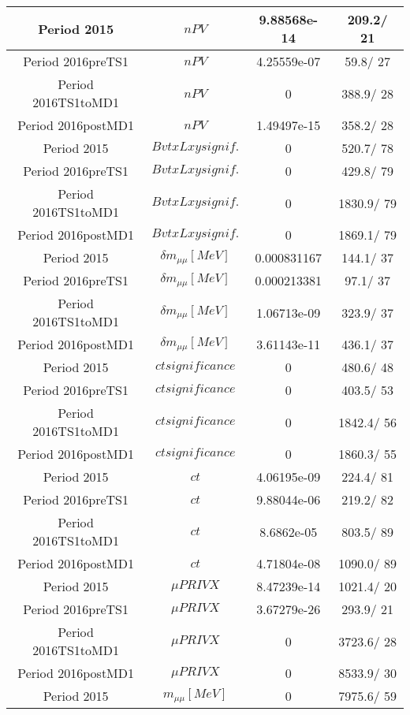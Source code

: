 \documentclass{article}
\begin{document}
\begin{longtable}{c|c|c|c}
\hline
 Period 2015 & $nPV$ & 9.88568e-14 & 209.2/ 21\\
\hline
 Period 2016preTS1 & $nPV$ & 4.25559e-07 &  59.8/ 27\\
\hline
 Period 2016TS1toMD1 & $nPV$ & 0 & 388.9/ 28\\
\hline
 Period 2016postMD1 & $nPV$ & 1.49497e-15 & 358.2/ 28\\
\hline
 Period 2015 & $BvtxLxy signif.$ & 0 & 520.7/ 78\\
\hline
 Period 2016preTS1 & $BvtxLxy signif.$ & 0 & 429.8/ 79\\
\hline
 Period 2016TS1toMD1 & $BvtxLxy signif.$ & 0 & 1830.9/ 79\\
\hline
 Period 2016postMD1 & $BvtxLxy signif.$ & 0 & 1869.1/ 79\\
\hline
 Period 2015 & $\delta m_{\mu\mu} [MeV]$ & 0.000831167 & 144.1/ 37\\
\hline
 Period 2016preTS1 & $\delta m_{\mu\mu} [MeV]$ & 0.000213381 &  97.1/ 37\\
\hline
 Period 2016TS1toMD1 & $\delta m_{\mu\mu} [MeV]$ & 1.06713e-09 & 323.9/ 37\\
\hline
 Period 2016postMD1 & $\delta m_{\mu\mu} [MeV]$ & 3.61143e-11 & 436.1/ 37\\
\hline
 Period 2015 & $ct significance$ & 0 & 480.6/ 48\\
\hline
 Period 2016preTS1 & $ct significance$ & 0 & 403.5/ 53\\
\hline
 Period 2016TS1toMD1 & $ct significance$ & 0 & 1842.4/ 56\\
\hline
 Period 2016postMD1 & $ct significance$ & 0 & 1860.3/ 55\\
\hline
 Period 2015 & $ct$ & 4.06195e-09 & 224.4/ 81\\
\hline
 Period 2016preTS1 & $ct$ & 9.88044e-06 & 219.2/ 82\\
\hline
 Period 2016TS1toMD1 & $ct$ & 8.6862e-05 & 803.5/ 89\\
\hline
 Period 2016postMD1 & $ct$ & 4.71804e-08 & 1090.0/ 89\\
\hline
 Period 2015 & $\mu PRIVX$ & 8.47239e-14 & 1021.4/ 20\\
\hline
 Period 2016preTS1 & $\mu PRIVX$ & 3.67279e-26 & 293.9/ 21\\
\hline
 Period 2016TS1toMD1 & $\mu PRIVX$ & 0 & 3723.6/ 28\\
\hline
 Period 2016postMD1 & $\mu PRIVX$ & 0 & 8533.9/ 30\\
\hline
 Period 2015 & $m_{\mu\mu} [MeV]$ & 0 & 7975.6/ 59\\

\end{longtable}
\end{document}
